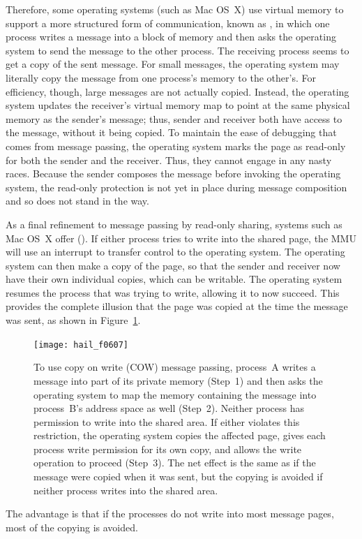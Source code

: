 Therefore, some operating systems (such as Mac OS~X) use virtual
memory to support a more structured form of communication, known as
, in which
one process writes a message into a block of memory and then asks the
operating system to send the message to the other process.  The
receiving process seems to get a copy of the sent message.  For small
messages, the operating system may literally copy the message from one
process's memory to the other's.  For efficiency, though, large
messages are not actually copied.  Instead, the operating system
updates the receiver's virtual memory map to point at the same
physical memory as the sender's message; thus, sender and receiver
both have access to the message, without it being copied.  To maintain
the ease of debugging that comes from message passing, the operating
system marks the page as read-only for both the sender and the
receiver.  Thus, they cannot engage in any nasty races.  Because the
sender composes the message before invoking the operating system, the
read-only protection is not yet in place during message composition
and so does not stand in the way.

As a final refinement to message passing by read-only sharing, systems
such as Mac OS~X offer  ().  If either
process tries to write into the shared page, the MMU will use an
interrupt to transfer control to the operating system.  The operating
system can then make a copy of the page, so that the sender and
receiver now have their own individual copies, which can be
writable.  The operating system resumes the process that was trying
to write, allowing it to now succeed.  This provides the complete
illusion that the page was copied at the time the message was sent, as
shown in Figure~\ref{scan-6-5}.
\begin{figure}
\centerline{\texttt{[image: hail\_f0607]}}
\caption{To use copy on write (COW) message passing, process~A
  writes a message into part of its private memory (Step~1) and then
  asks the operating system to map the memory containing the message into process~B's
  address space as well (Step~2).  Neither process has permission to write into
  the shared area.  If either violates this restriction, the operating
  system copies the affected page, gives each process write
  permission for its own copy, and allows the write operation to
  proceed (Step~3).  The net effect is the same as if the message were copied
  when it was sent, but the copying is avoided if neither process writes into
  the shared area.}
\label{scan-6-5}
\end{figure}
The advantage is that if the processes do not write into most message pages, most
of the copying is avoided.

